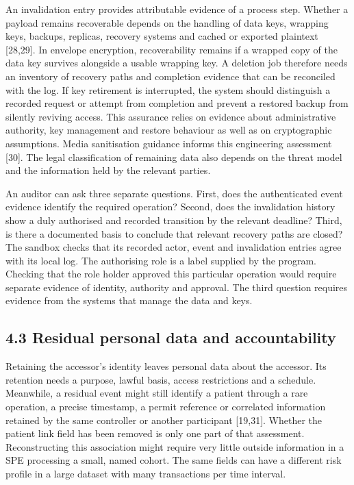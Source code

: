 \documentclass[preprint,review,12pt]{elsarticle}
\begin{document}
An invalidation entry provides attributable evidence of a process step.
Whether a payload remains recoverable depends on the handling of data
keys, wrapping keys, backups, replicas, recovery systems and cached or
exported plaintext {[}28,29{]}. In envelope encryption, recoverability
remains if a wrapped copy of the data key survives alongside a usable
wrapping key. A deletion job therefore needs an inventory of recovery
paths and completion evidence that can be reconciled with the log. If
key retirement is interrupted, the system should distinguish a recorded
request or attempt from completion and prevent a restored backup from
silently reviving access. This assurance relies on evidence about
administrative authority, key management and restore behaviour as well
as on cryptographic assumptions. Media sanitisation guidance informs
this engineering assessment {[}30{]}. The legal classification of
remaining data also depends on the threat model and the information held
by the relevant parties.

An auditor can ask three separate questions. First, does the
authenticated event evidence identify the required operation? Second,
does the invalidation history show a duly authorised and recorded
transition by the relevant deadline? Third, is there a documented basis
to conclude that relevant recovery paths are closed? The sandbox checks
that its recorded actor, event and invalidation entries agree with its
local log. The authorising role is a label supplied by the program.
Checking that the role holder approved this particular operation would
require separate evidence of identity, authority and approval. The third
question requires evidence from the systems that manage the data and
keys.

\hypertarget{residual-personal-data-and-accountability}{%
\subsection{4.3 Residual personal data and
accountability}\label{residual-personal-data-and-accountability}}

Retaining the accessor's identity leaves personal data about the
accessor. Its retention needs a purpose, lawful basis, access
restrictions and a schedule. Meanwhile, a residual event might still
identify a patient through a rare operation, a precise timestamp, a
permit reference or correlated information retained by the same
controller or another participant {[}19,31{]}. Whether the patient link
field has been removed is only one part of that assessment.
Reconstructing this association might require very little outside
information in a SPE processing a small, named cohort. The same fields
can have a different risk profile in a large dataset with many
transactions per time interval.
\end{document}
